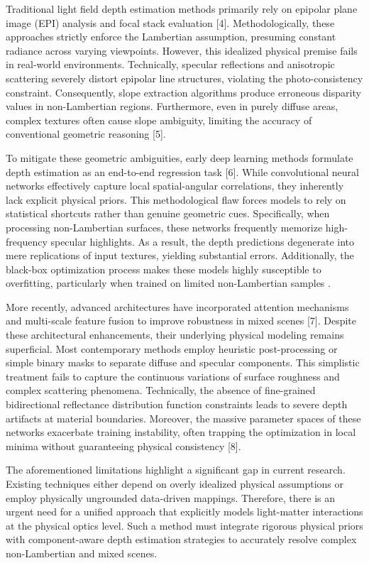 Traditional light field depth estimation methods primarily rely on epipolar plane image (EPI) analysis and focal stack evaluation [4]. Methodologically, these approaches strictly enforce the Lambertian assumption, presuming constant radiance across varying viewpoints. However, this idealized physical premise fails in real-world environments. Technically, specular reflections and anisotropic scattering severely distort epipolar line structures, violating the photo-consistency constraint. Consequently, slope extraction algorithms produce erroneous disparity values in non-Lambertian regions. Furthermore, even in purely diffuse areas, complex textures often cause slope ambiguity, limiting the accuracy of conventional geometric reasoning [5].

To mitigate these geometric ambiguities, early deep learning methods formulate depth estimation as an end-to-end regression task [6]. While convolutional neural networks effectively capture local spatial-angular correlations, they inherently lack explicit physical priors. This methodological flaw forces models to rely on statistical shortcuts rather than genuine geometric cues. Specifically, when processing non-Lambertian surfaces, these networks frequently memorize high-frequency specular highlights. As a result, the depth predictions degenerate into mere replications of input textures, yielding substantial errors. Additionally, the black-box optimization process makes these models highly susceptible to overfitting, particularly when trained on limited non-Lambertian samples .

More recently, advanced architectures have incorporated attention mechanisms and multi-scale feature fusion to improve robustness in mixed scenes [7]. Despite these architectural enhancements, their underlying physical modeling remains superficial. Most contemporary methods employ heuristic post-processing or simple binary masks to separate diffuse and specular components. This simplistic treatment fails to capture the continuous variations of surface roughness and complex scattering phenomena. Technically, the absence of fine-grained bidirectional reflectance distribution function constraints leads to severe depth artifacts at material boundaries. Moreover, the massive parameter spaces of these networks exacerbate training instability, often trapping the optimization in local minima without guaranteeing physical consistency [8].

The aforementioned limitations highlight a significant gap in current research. Existing techniques either depend on overly idealized physical assumptions or employ physically ungrounded data-driven mappings. Therefore, there is an urgent need for a unified approach that explicitly models light-matter interactions at the physical optics level. Such a method must integrate rigorous physical priors with component-aware depth estimation strategies to accurately resolve complex non-Lambertian and mixed scenes.


